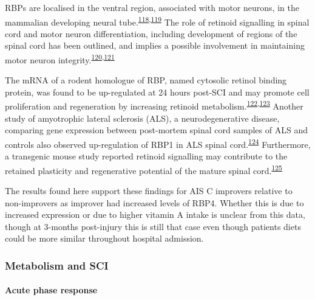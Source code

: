 \documentclass[
]{article}
\begin{document}
RBPs are localised in the ventral region, associated with motor neurons, in the mammalian developing neural tube.\textsuperscript{\protect\hyperlink{ref-pierani_sonic_1999}{118},\protect\hyperlink{ref-maden_retinoid-binding_1990}{119}}
The role of retinoid signalling in spinal cord and motor neuron differentiation, including development of regions of the spinal cord has been outlined, and implies a possible involvement in maintaining motor neuron integrity.\textsuperscript{\protect\hyperlink{ref-colbert_retinoid_1995}{120},\protect\hyperlink{ref-sockanathan_motor_1998}{121}}

The mRNA of a rodent homologue of RBP, named cytosolic retinol binding protein, was found to be up-regulated at 24 hours post-SCI and may promote cell proliferation and regeneration by increasing retinoid metabolism.\textsuperscript{\protect\hyperlink{ref-song_genechip_2001}{122},\protect\hyperlink{ref-hurst_complexity_1999}{123}}
Another study of amyotrophic lateral sclerosis (ALS), a neurodegenerative disease, comparing gene expression between post-mortem spinal cord samples of ALS and controls also observed up-regulation of RBP1 in ALS spinal cord.\textsuperscript{\protect\hyperlink{ref-malaspina_differential_2001}{124}}
Furthermore, a transgenic mouse study reported retinoid signalling may contribute to the retained plasticity and regenerative potential of the mature spinal cord.\textsuperscript{\protect\hyperlink{ref-haskell_retinoic_2002}{125}}

The results found here support these findings for AIS C improvers relative to non-improvers as improver had increased levels of RBP4.
Whether this is due to increased expression or due to higher vitamin A intake is unclear from this data, though at 3-months post-injury this is still that case even though patients diets could be more similar throughout hospital admission.

\hypertarget{metabolism-and-sci}{%
\subsubsection{Metabolism and SCI}\label{metabolism-and-sci}}

\hypertarget{acute-phase-response}{%
\paragraph{Acute phase response}\label{acute-phase-response}}
\end{document}
